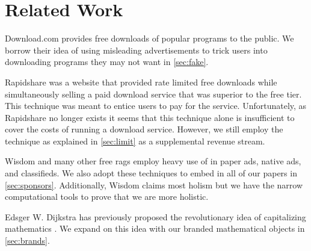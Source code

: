 \section{Related Work}
\label{sec:related}

Download.com \cite{download-com} provides free downloads of popular programs to
the public.
We borrow their idea of using misleading advertisements to trick users into
downloading programs they may not want in \autoref{sec:fake}.

Rapidshare \cite{rapidshare} was a website that provided rate limited free
downloads while simultaneously selling a paid download service that was
superior to the free tier.
This technique was meant to entice users to pay for the service.
Unfortunately, as Rapidshare no longer exists it seems that this technique
alone is insufficient to cover the costs of running a download service.
However, we still employ the technique as explained in \autoref{sec:limit} as a
supplemental revenue stream.

Wisdom \cite{wisdom} and many other free rags employ heavy use of in paper ads,
native ads, and classifieds.
We also adopt these techniques to embed in all of our papers in
\autoref{sec:sponsors}.
Additionally, Wisdom claims most holism but we have the narrow computational
tools to prove that we are more holistic.

Edsger W. Dijkstra has previously proposed the revolutionary idea of
capitalizing mathematics \cite{cap-math}.
We expand on this idea with our branded mathematical objects in
\autoref{sec:brands}.
